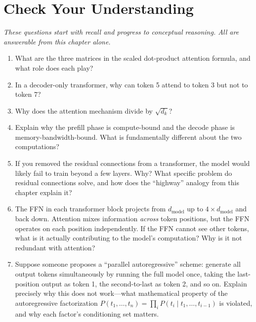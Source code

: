 \section*{Check Your Understanding}

\emph{These questions start with recall and progress to conceptual reasoning. All are answerable from this chapter alone.}

\begin{enumerate}
    \item What are the three matrices in the scaled dot-product attention formula, and what role does each play?

    \item In a decoder-only transformer, why can token 5 attend to token 3 but not to token 7?

    \item Why does the attention mechanism divide by $\sqrt{d_k}$?

    \item Explain why the prefill phase is compute-bound and the decode phase is memory-bandwidth-bound. What is fundamentally different about the two computations?

    \item If you removed the residual connections from a transformer, the model would likely fail to train beyond a few layers. Why? What specific problem do residual connections solve, and how does the ``highway'' analogy from this chapter explain it?

    \item The FFN in each transformer block projects from $d_{\text{model}}$ up to $4 \times d_{\text{model}}$ and back down. Attention mixes information \emph{across} token positions, but the FFN operates on each position independently. If the FFN cannot see other tokens, what is it actually contributing to the model's computation? Why is it not redundant with attention?

    \item Suppose someone proposes a ``parallel autoregressive'' scheme: generate all output tokens simultaneously by running the full model once, taking the last-position output as token 1, the second-to-last as token 2, and so on. Explain precisely why this does not work---what mathematical property of the autoregressive factorization $P(t_1, \ldots, t_n) = \prod_i P(t_i \mid t_1, \ldots, t_{i-1})$ is violated, and why each factor's conditioning set matters.


\end{enumerate}
